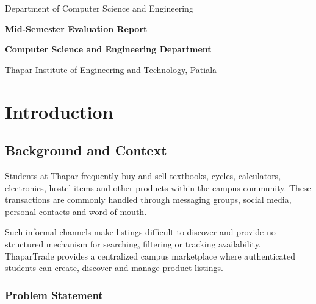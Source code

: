\documentclass[12pt,a4paper,oneside]{report}
\begin{document}
\begin{titlepage}
{\normalsize Department of Computer Science and Engineering}

\vspace{1.2cm}

\vfill

{\normalsize\textbf{Mid-Semester Evaluation Report}}

\vspace{0.15cm}

{\normalsize\textbf{Computer Science and Engineering Department}}

\vspace{0.1cm}

{\normalsize Thapar Institute of Engineering and Technology, Patiala}

\end{titlepage}



\tableofcontents

\newpage



\chapter{Introduction}

\section{Background and Context}

Students at Thapar frequently buy and sell textbooks, cycles,
calculators, electronics, hostel items and other products within the
campus community. These transactions are commonly handled through
messaging groups, social media, personal contacts and word of mouth.

Such informal channels make listings difficult to discover and provide
no structured mechanism for searching, filtering or tracking
availability. ThaparTrade provides a centralized campus marketplace
where authenticated students can create, discover and manage product
listings.

\subsection{Problem Statement}
\end{document}
